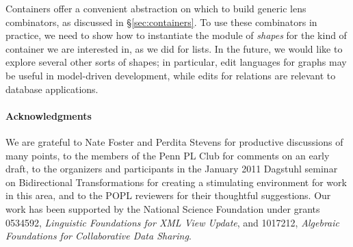 \documentclass{sigplanconf}
\begin{document}
Containers offer a convenient abstraction on which to build generic lens
combinators, as discussed in \S \ref{sec:containers}. To use these
combinators in practice, we need to show how to instantiate the module of
\emph{shapes} for the kind of container we are interested in, as we did for
lists. In the future, we would like to explore several other sorts of
shapes; in particular, edit languages for graphs may be useful in
model-driven development, while edits for relations are relevant to database
applications.

\ifanon \else \paragraph*{Acknowledgments}
We are grateful to
Nate Foster and Perdita Stevens for productive discussions of many points,
to the members of the Penn PL Club for comments on an early draft, to
the organizers and participants in the January 2011 Dagstuhl seminar on
Bidirectional Transformations for creating a stimulating environment for work
in this area, and to the POPL reviewers for their thoughtful suggestions.  Our work has been supported by the National Science 
Foundation under grants 0534592, \emph{Linguistic Foundations for XML View
  Update}, and 1017212, \emph{Algebraic Foundations for Collaborative Data
  Sharing}.  \fi

\let\section\OLDsection

\iffull\else\vfill\eject\fi


\end{document}
